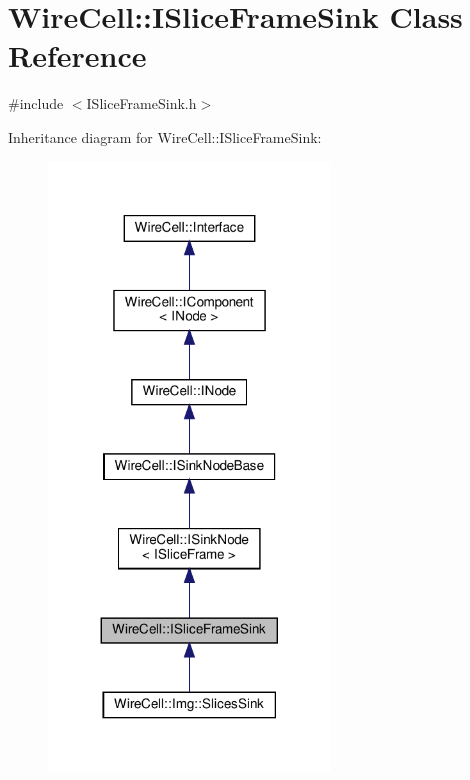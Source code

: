 \hypertarget{class_wire_cell_1_1_i_slice_frame_sink}{}\section{Wire\+Cell\+:\+:I\+Slice\+Frame\+Sink Class Reference}
\label{class_wire_cell_1_1_i_slice_frame_sink}


{\ttfamily \#include $<$I\+Slice\+Frame\+Sink.\+h$>$}



Inheritance diagram for Wire\+Cell\+:\+:I\+Slice\+Frame\+Sink\+:
\nopagebreak
\begin{figure}[H]
\begin{center}
\leavevmode
\includegraphics[width=212pt]{class_wire_cell_1_1_i_slice_frame_sink__inherit__graph}
\end{center}
\end{figure}


